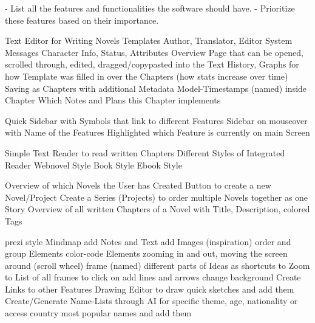    - List all the features and functionalities the software should have.
   - Prioritize these features based on their importance.
\begin{outline}
    \1 Text Editor for Writing Novels
    \1 Templates
      \2 Author, Translator, Editor
      \2 System Messages
      \2 Character Info, Status, Attributes
      \2 Overview Page that can be opened, scrolled through, edited, dragged/copypasted into the Text
      \2 History, Graphs for how Template was filled in over the Chapters (how stats increase over time) 
    \1 Saving as Chapters with additional Metadata  
      \2 Model-Timestamps (named) inside Chapter 
      \2 Which Notes and Plans this Chapter implements
\end{outline}

\begin{outline}
    \1 Quick Sidebar with Symbols that link to different Features 
    \1 Sidebar on mouseover with Name of the Features 
    \1 Highlighted which Feature is currently on main Screen
\end{outline}

\begin{outline}
    \1 Simple Text Reader to read written Chapters
    \1 Different Styles of Integrated Reader
      \2 Webnovel Style
      \2 Book Style
      \2 Ebook Style
\end{outline}

\begin{outline}
    \1 Overview of which Novels the User has Created
    \1 Button to create a new Novel/Project
    \1 Create a Series (Projects) to order multiple Novels together as one Story
    \1 Overview of all written Chapters of a Novel with Title, Description, colored Tags
\end{outline}

\begin{outline}
    \1 prezi style Mindmap
      \2 add Notes and Text
      \2 add Images (inspiration)
      \2 order and group Elements
      \2 color-code Elements
      \2 zooming in and out, moving the screen around (scroll wheel)
      \2 frame (named) different parts of Ideas as shortcuts to Zoom to
      \2 List of all frames to click on
      \2 add lines and arrows
      \2 change background
    \1 Create Links to other Features
    \1 Drawing Editor to draw quick sketches and add them
    \1 Create/Generate Name-Lists through AI for specific theme, age, nationality or access country most popular names and add them

\end{outline}

